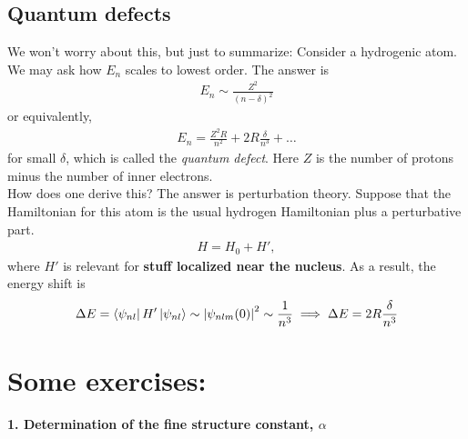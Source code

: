\documentclass{book}
\theoremstyle{definition}
\newcommand{\al}{\alpha}
\newcommand{\f}[2]{\frac{#1}{#2}}
\begin{document}
\subsection{Quantum defects}

We won't worry about this, but just to summarize: Consider a hydrogenic atom. We may ask how $E_n$ scales to lowest order. The answer is 
\begin{align*}
	E_n \sim \f{Z^2}{(n-\delta)^2}
\end{align*}
or equivalently, 
\begin{align*}
	E_n  = \f{Z^2R}{n^2} + 2R\f{\delta}{n^3} + \dots 
\end{align*}
for small $\delta$, which is called the \textit{quantum defect}. Here $Z$ is the number of protons minus the number of inner electrons. \\


How does one derive this? The answer is perturbation theory. Suppose that the Hamiltonian for this atom is the usual hydrogen Hamiltonian plus a perturbative part. 
\begin{align*}
	H = H_0 + H',
\end{align*}
where $H'$ is relevant for \textbf{stuff localized near the nucleus}. As a result, the energy shift is 
\begin{align*}
	\Delta E = \bra{\psi_{nl}} H' \ket{\psi_{nl}} \sim \abs{\psi_{nlm}(0)}^2 \sim \f{1}{n^3} \implies \Delta E = 2R\f{\delta}{n^3}
\end{align*}


\section{Some exercises:}

\noindent \textbf{1. Determination of the fine structure constant, $\al$}
\end{document}
